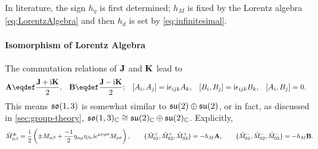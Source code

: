 \documentclass[CheatSheet]{subfiles}
\begin{document}
In literature, the sign $h_\eta$ is first determined; $h_M$ is fixed by the Lorentz algebra \eqref{eq:LorentzAlgebra} and then $h_d$ is set by \eqref{eq:infinitesimal}.


\paragraph{Isomorphism of Lorentz Algebra}
The commutation relations of ${\mathbf{J}}$ and ${\mathbf{K}}$ lead to
\begin{align}
 \vc A&\eqdef\frac{\vc J+\ii \vc K}{2},&
 \vc B&\eqdef\frac{\vc J-\ii \vc K}{2};&
 [A_i, A_j] &= \ii \epsilon_{ijk}A_k,&
 [B_i, B_j] &= \ii \epsilon_{ijk}B_k,&
 [A_i, B_j] &= 0.
\end{align}
This means $\operatorname{\mathfrak{so}}(1,3)$ is somewhat similar to $\operatorname{\mathfrak{su}}(2)\oplus \operatorname{\mathfrak{su}}(2)$, or in fact,
as discussed in \cref{sec:group-theory},
$\operatorname{\mathfrak{so}}(1,3)_{\mathbb C}\cong \operatorname{\mathfrak{su}}(2)_{\mathbb C}\oplus\operatorname{\mathfrak{su}}(2)_{\mathbb C}$.
Explicitly,
\[
\tilde M^{\pm}_{\alpha\beta} =
\frac{{\mathrm{i}}}{2}\left(\pm M_{\alpha\beta} + \frac{-1}{2}\eta_{\alpha\mu}\eta_{\beta\nu}{\mathrm{i}}\epsilon^{\mu\nu\rho\sigma}M_{\rho\sigma}\right),\qquad
\{\tilde M^+_{01},\tilde M^+_{02},\tilde M^+_{03}\}=-h_M{\mathbf{A}},\qquad
\{\tilde M^-_{01},\tilde M^-_{02},\tilde M^-_{03}\}=-h_M{\mathbf{B}}.
\]

\end{document}
